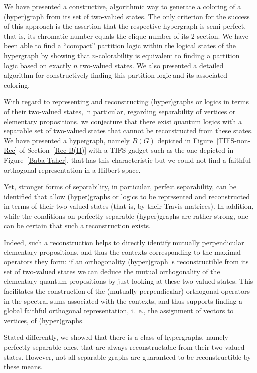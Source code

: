 \documentclass[%
12pt,
prereprint,
showpacs,
showkeys,
preprintnumbers,
amsmath,amssymb,
aps,
pra,
longbibliography,
notitlepage
]{revtex4-1}
\theoremstyle{definition}
\begin{document}
	
	We have presented a constructive, algorithmic way to generate a coloring of a (hyper)graph from its set of two-valued states.  The only criterion for the success of this approach is the assertion that the respective hypergraph is semi-perfect, that is, its chromatic number equals the clique number of its 2-section.
	We have been able to find a ``compact'' partition logic within the logical states of the hypergraph by showing that $n$-colorability  is equivalent to finding a partition logic based on exactly $n$ two-valued states. We also presented a detailed algorithm for constructively finding this partition logic and its associated coloring.
	
	With regard to representing and reconstructing (hyper)graphs or logics in terms of their two-valued states, in particular, regarding separability of vertices or elementary propositions, we conjecture that there exist quantum logics with a separable set of two-valued states that cannot be reconstructed from these states. We have presented a hypergraph, namely  $B(G)$ depicted in Figure~\ref{TIFS-non-Rec} of Section~\ref{Rec-B(H)} with a TIFS gadget such as the one depicted in Figure~\ref{Baba-Taher}, that has this characteristic but we could not find a faithful orthogonal representation in a Hilbert space.
	
	Yet, stronger forms of separability, in particular, perfect separability, can be identified that allow (hyper)graphs or logics to be represented and reconstructed in terms of their two-valued states (that is, by their Travis matrices). In addition, while the conditions on perfectly separable (hyper)graphs are rather strong, one can be certain that such a reconstruction exists.
	
	Indeed, such a reconstruction helps to directly identify mutually perpendicular elementary propositions, and thus the contexts corresponding to the maximal operators they form: if an orthogonality (hyper)graph is reconstructible from its set of two-valued states we can deduce the mutual orthogonality of the elementary quantum propositions by just looking at these two-valued states. This facilitates the construction of the (mutually perpendicular) orthogonal operators in the spectral sums associated with the contexts, and thus supports finding a global faithful orthogonal representation, i.~e., the assignment of vectors to vertices, of (hyper)graphs.
	
	Stated differently, we showed that there is a class of hypergraphs, namely perfectly separable ones, that are always reconstructable from their two-valued states.
	However, not all separable graphs are guaranteed to be reconstructible by these means.
	
\end{document}

